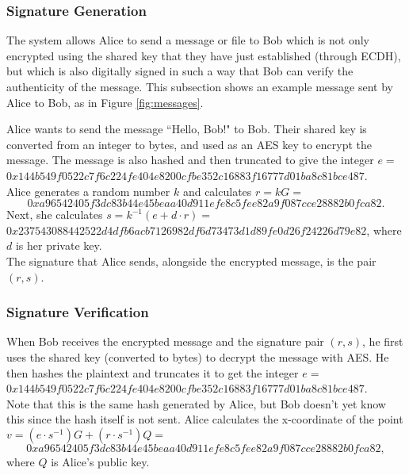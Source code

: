\documentclass[12pt,a4paper]{article}
\begin{document}
\subsubsection{Signature Generation}\noindent
The system allows Alice to send a message or file to Bob which is not only encrypted using the shared key that they have just established (through ECDH), 
but which is also digitally signed in such a way that Bob can verify the authenticity of the message. 
This subsection shows an example message sent by Alice to Bob, as in Figure \ref{fig:messages}. 

Alice wants to send the message ``Hello, Bob!" to Bob. 
Their shared key is converted from an integer to bytes, and used as an AES key to encrypt the message. 
The message is also hashed and then truncated to give the integer $e =$ \\
{\footnotesize $0x144b549f0522c7f6c224fe404e8200cfbe352c16883f16777d01ba8c81bce487$}. \\
Alice generates a random number $k$ and calculates $r = kG =$ 
\begin{equation}
    0xa96542405f3dc83b44e45beaa40d911efe8c5fee82a9f087cce28882b0fca82.
\end{equation}
Next, she calculates $s = k^{-1}(e + d \cdot r) =$ \\
{\footnotesize $0x237543088442522d4dfb6acb7126982df6d73473d1d89fe0d26f24226d79e82$}, where $d$ is her private key. \\
The signature that Alice sends, alongside the encrypted message, is the pair $(r,s)$. 

\subsubsection{Signature Verification}\noindent
When Bob receives the encrypted message and the signature pair $(r,s)$, 
he first uses the shared key (converted to bytes) to decrypt the message with AES. 
He then hashes the plaintext and truncates it to get the integer $e =$ \\
{\footnotesize$0x144b549f0522c7f6c224fe404e8200cfbe352c16883f16777d01ba8c81bce487$}. \\
Note that this is the same hash generated by Alice, but Bob doesn't yet know this since the hash itself is not sent. 
Alice calculates the x-coordinate of the point $v = (e \cdot s^{-1})G + (r \cdot s^{-1})Q =$ \\
\begin{equation}
    0xa96542405f3dc83b44e45beaa40d911efe8c5fee82a9f087cce28882b0fca82,
\end{equation}
where $Q$ is Alice's public key. 
\end{document}

